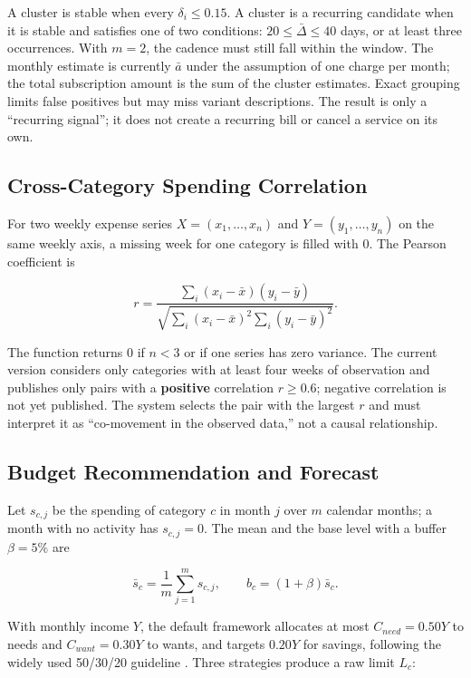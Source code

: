 A cluster is stable when every $\delta_i\leq0.15$. A cluster is a
recurring candidate when it is stable and satisfies one of two
conditions: $20\leq\bar\Delta\leq40$ days, or at least three
occurrences. With $m=2$, the cadence must still fall within the window.
The monthly estimate is currently $\bar a$ under the assumption of one
charge per month; the total subscription amount is the sum of the
cluster estimates. Exact grouping limits false positives but may miss
variant descriptions. The result is only a ``recurring signal''; it does
not create a recurring bill or cancel a service on its own.

\subsection{Cross-Category Spending Correlation}

For two weekly expense series $X=(x_1,\ldots,x_n)$ and
$Y=(y_1,\ldots,y_n)$ on the same weekly axis, a missing week for one
category is filled with 0. The Pearson coefficient \cite{pearson1895} is

\begin{equation}
  r=\frac{\sum_i(x_i-\bar{x})(y_i-\bar{y})}
  {\sqrt{\sum_i(x_i-\bar{x})^2\sum_i(y_i-\bar{y})^2}}.
\end{equation}

The function returns 0 if $n<3$ or if one series has zero variance. The
current version considers only categories with at least four weeks of
observation and publishes only pairs with a \textbf{positive}
correlation $r\geq0.6$; negative correlation is not yet published. The
system selects the pair with the largest $r$ and must interpret it as
``co-movement in the observed data,'' not a causal relationship.

\subsection{Budget Recommendation and Forecast}

Let $s_{c,j}$ be the spending of category $c$ in month $j$ over $m$
calendar months; a month with no activity has $s_{c,j}=0$. The mean and
the base level with a buffer $\beta=5\%$ are

\begin{equation}
  \bar s_c=\frac{1}{m}\sum_{j=1}^{m}s_{c,j},\qquad
  b_c=(1+\beta)\bar s_c.
\end{equation}

With monthly income $Y$, the default framework allocates at most
$C_{need}=0.50Y$ to needs and $C_{want}=0.30Y$ to wants, and targets
$0.20Y$ for savings, following the widely used 50/30/20 guideline
\cite{warren2005}. Three strategies produce a raw limit $L_c$:

